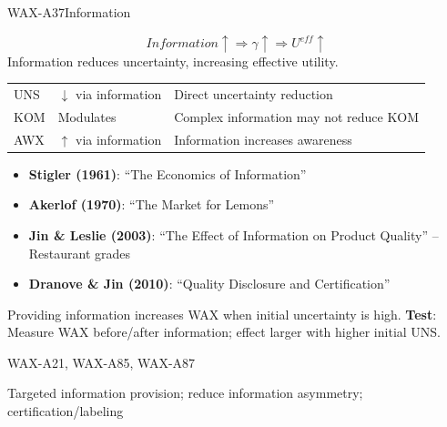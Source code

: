 \begin{axiomspec}{WAX-A37}{Information}

\begin{equation}
Information \uparrow \Rightarrow \gamma \uparrow \Rightarrow U^{eff} \uparrow
\end{equation}
Information reduces uncertainty, increasing effective utility.

\begin{tabular}{lll}
UNS & $\downarrow$ via information & Direct uncertainty reduction \\
KOM & Modulates & Complex information may not reduce KOM \\
AWX & $\uparrow$ via information & Information increases awareness \\
\end{tabular}

\begin{itemize}
\item \textbf{Stigler (1961)}: ``The Economics of Information''
\item \textbf{Akerlof (1970)}: ``The Market for Lemons''
\item \textbf{Jin \& Leslie (2003)}: ``The Effect of Information on Product Quality'' -- Restaurant grades
\item \textbf{Dranove \& Jin (2010)}: ``Quality Disclosure and Certification''
\end{itemize}

Providing information increases WAX when initial uncertainty is high.
\textbf{Test}: Measure WAX before/after information; effect larger with higher initial UNS.

WAX-A21, WAX-A85, WAX-A87

Targeted information provision; reduce information asymmetry; certification/labeling

\end{axiomspec}


